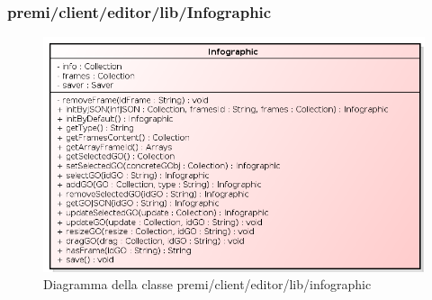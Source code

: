 \subsubsection{premi/client/editor/lib/Infographic}
\begin{figure}[H]
\begin{center}
\includegraphics[scale=0.80]{img/diacla/Infographic.png}
\caption{Diagramma della classe premi/client/editor/lib/infographic}
\end{center}
\end{figure}

